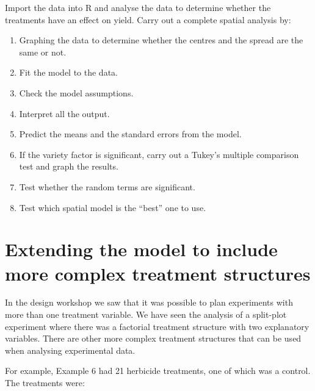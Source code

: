 \documentclass[a4paper, 10pt, fleqn, twosided]{memoir}
\begin{document}
Import the data into R and analyse the data to determine whether the treatments
have an effect on yield. Carry out a complete spatial analysis by:

\begin{enumerate}
  \item Graphing the data to determine whether the centres and the spread are
      the same or not.
  \item Fit the model to the data.
  \item Check the model assumptions.
  \item Interpret all the output.
  \item Predict the means and the standard errors from the model.
  \item If the variety factor is significant, carry out a Tukey's multiple
      comparison test and graph the results.
  \item Test whether the random terms are significant.
  \item Test which spatial model is the ``best'' one to use.
\end{enumerate}


\chapter[Modelling complex treatment structures]{Extending the model to include more complex treatment structures}

In the design workshop we saw that it was possible to plan experiments with more than one treatment variable. We have
seen the analysis of a split-plot experiment where there was a factorial treatment structure with two explanatory
variables. There are other more complex treatment structures that can be used when analysing experimental data.

For example, Example 6 had 21 herbicide treatments, one of which was a control. The treatments were:
\end{document}
